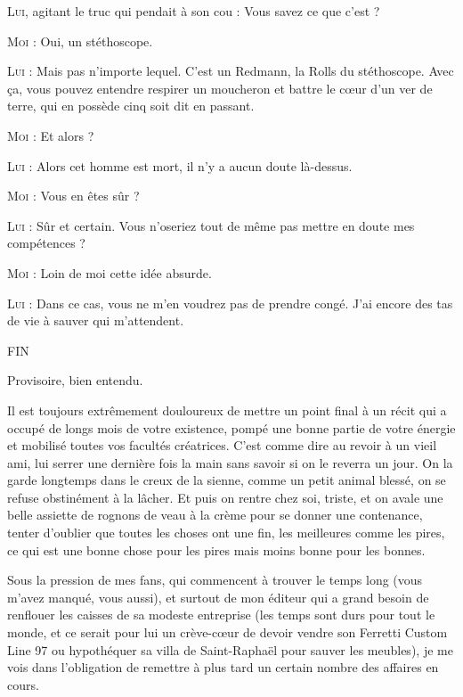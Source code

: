 \begin{dialogue}
\textsc{Lui}, agitant le truc qui pendait à son cou : Vous savez ce que c’est ?

\textsc{Moi} : Oui, un stéthoscope.

\textsc{Lui} : Mais pas n’importe lequel. C’est un Redmann, la Rolls du stéthoscope. Avec ça, vous pouvez entendre respirer un moucheron et battre le cœur d’un ver de terre, qui en possède cinq soit dit en passant.

\textsc{Moi} : Et alors ?

\textsc{Lui} : Alors cet homme est mort, il n’y a aucun doute là-dessus.

\textsc{Moi} : Vous en êtes sûr ?

\textsc{Lui} : Sûr et certain. Vous n’oseriez tout de même pas mettre en doute mes compétences ?

\textsc{Moi} : Loin de moi cette idée absurde.

\textsc{Lui} : Dans ce cas, vous ne m’en voudrez pas de prendre congé. J’ai encore des tas de vie à sauver qui m’attendent.


\end{dialogue}

\vspace{\onelineskip}
{\centering FIN\par}
\vspace{\onelineskip}

\noindent Provisoire, bien entendu.

\scene

Il est toujours extrêmement douloureux de mettre un point final à un récit qui a occupé de longs mois de votre existence, pompé une bonne partie de votre énergie et mobilisé toutes vos facultés créatrices. C’est comme dire au revoir à un vieil ami, lui serrer une dernière fois la main sans savoir si on le reverra un jour. On la garde longtemps dans le creux de la sienne, comme un petit animal blessé, on se refuse obstinément à la lâcher. Et puis on rentre chez soi, triste, et on avale une belle assiette de rognons de veau à la crème pour se donner une contenance, tenter d’oublier que toutes les choses ont une fin, les meilleures comme les pires, ce qui est une bonne chose pour les pires mais moins bonne pour les bonnes.

\illusloflabel{}%
%
%
Sous la pression de mes fans, qui commencent à trouver le temps long (vous m’avez manqué, vous aussi), et surtout de mon éditeur qui a grand besoin de renflouer les caisses de sa modeste entreprise (les temps sont durs pour tout le monde, et ce serait pour lui un crève-cœur de devoir vendre son Ferretti Custom Line 97 ou hypothéquer sa villa de Saint-Raphaël pour sauver les meubles), je me vois dans l’obligation de remettre à plus tard un certain nombre des affaires en cours.

